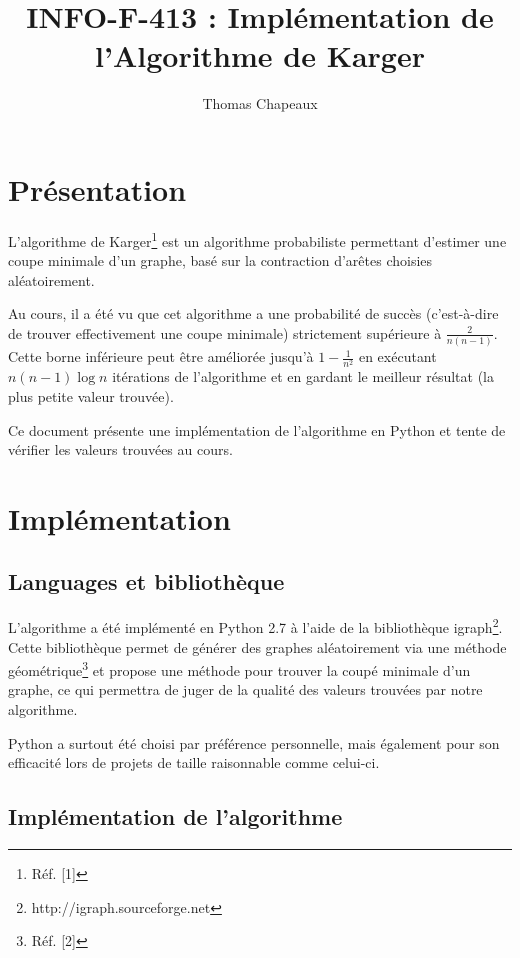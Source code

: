 \documentclass[a4paper,10pt]{article}
\title{INFO-F-413 : Implémentation de l'Algorithme de Karger}
\author{Thomas Chapeaux}
\begin{document}
\sloppy
\maketitle

\section{Présentation}

L'algorithme de 
Karger\footnote{Réf. [1]}
est un algorithme probabiliste permettant d'estimer une coupe minimale d'un graphe,
basé sur la contraction d'arêtes choisies aléatoirement.

Au cours, il a été vu que cet algorithme a une probabilité de succès (c'est-à-dire de trouver effectivement une coupe minimale) strictement supérieure à
\begin{math} \frac{2}{n(n-1)} \end{math}.
Cette borne inférieure peut être améliorée jusqu'à
\begin{math} 1- \frac{1}{n^{2}} \end{math} en exécutant
\begin{math} n(n-1)\log{n} \end{math} itérations de l'algorithme et en gardant le meilleur résultat (la plus petite valeur trouvée).

Ce document présente une implémentation de l'algorithme en Python et tente de vérifier les valeurs trouvées au cours.

\section{Implémentation}

\subsection{Languages et bibliothèque}
L'algorithme a été implémenté en Python 2.7 à l'aide de la bibliothèque
igraph\footnote{http://igraph.sourceforge.net}.
Cette bibliothèque permet de générer des graphes aléatoirement via une méthode
géométrique\footnote{Réf. [2]}
et propose une méthode pour trouver la coupé minimale d'un graphe, ce qui permettra de juger de la qualité des valeurs trouvées par notre algorithme.

Python a surtout été choisi par préférence personnelle, mais également pour son efficacité lors de projets de taille raisonnable comme celui-ci.

\subsection{Implémentation de l'algorithme}
\end{document}
